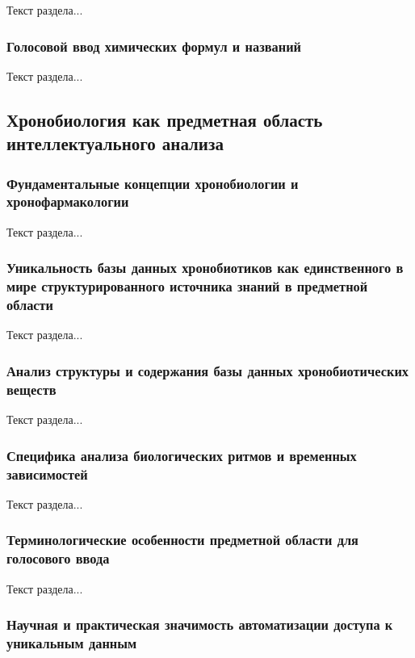 Текст раздела...

\subsubsection{Голосовой ввод химических формул и названий}

Текст раздела...

\subsection{Хронобиология как предметная область интеллектуального анализа}

\subsubsection{Фундаментальные концепции хронобиологии и хронофармакологии}

Текст раздела...

\subsubsection{Уникальность базы данных хронобиотиков как единственного в мире структурированного источника знаний в предметной области}

Текст раздела...

\subsubsection{Анализ структуры и содержания базы данных хронобиотических веществ}

Текст раздела...

\subsubsection{Специфика анализа биологических ритмов и временных зависимостей}

Текст раздела...

\subsubsection{Терминологические особенности предметной области для голосового ввода}

Текст раздела...

\subsubsection{Научная и практическая значимость автоматизации доступа к уникальным данным}

